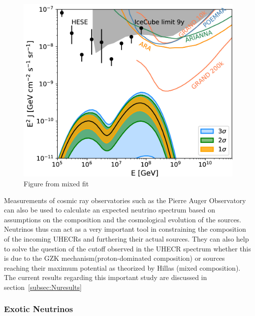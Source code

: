 \begin{figure}[t!]
  \centering
  \includegraphics[width=14.5cm]{thesis_figures/CRnNu/apjab05cef9_hr.jpg}
  \caption{Figure from mixed fit~\cite{Heinze:2019jou}}
  \label{fig:model_nu_auger_mixed}
\end{figure}

Measurements of cosmic ray observatories such as the Pierre Auger Observatory can also be used to calculate an expected neutrino spectrum based on assumptions on the composition and the cosmological evolution of the sources. Neutrinos thus can act as a very important tool in constraining the composition of the incoming UHECRs and furthering their actual sources. They can also help to solve the question of the cutoff observed in the UHECR spectrum whether this is due to the GZK mechanism(proton-dominated composition) or sources reaching their maximum potential as theorized by Hillas (mixed composition). The current results regarding this important study are discussed in section~\ref{subsec:Nuresults}


\subsubsection*{Exotic Neutrinos}
\label{subsubsec:ExoticNu}

